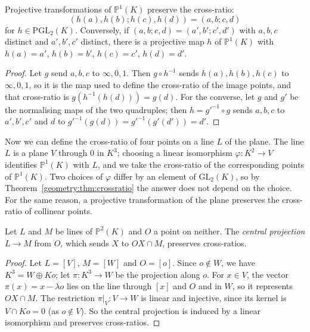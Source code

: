 \begin{theorem}\label{geometry:thm:crossratio}
Projective transformations of $\mathbb P^1(K)$ preserve the cross-ratio:
\[
(h(a),h(b);h(c),h(d))=(a,b;c,d)
\]
for $h\in\mathrm{PGL}_2(K)$.
Conversely, if $(a,b;c,d)=(a',b';c',d')$ with $a,b,c$ distinct and $a',b',c'$ distinct, there is a projective map $h$ of $\mathbb P^1(K)$ with $h(a)=a'$,
$h(b)=b'$, $h(c)=c'$, $h(d)=d'$.
\end{theorem}

\begin{proof}
Let $g$ send $a,b,c$ to $\infty,0,1$. Then $g\circ h^{-1}$ sends $h(a),h(b),h(c)$ to $\infty,0,1$, so it is the map used to define the cross-ratio of
the image points, and that cross-ratio is $g(h^{-1}(h(d)))=g(d)$. For the converse, let $g$ and $g'$ be the normalising maps of the two
quadruples; then $h=g'^{-1}\circ g$ sends $a,b,c$ to $a',b',c'$ and $d$ to $g'^{-1}(g(d))=g'^{-1}(g'(d'))=d'$.
\end{proof}

Now we can define the cross-ratio of four points on a line $L$ of the plane. The line $L$ is a plane $V$ through $0$ in $K^3$; choosing a linear
isomorphism $\varphi:K^2\to V$ identifies $\mathbb P^1(K)$ with $L$, and we take the cross-ratio of the corresponding points of $\mathbb P^1(K)$.
Two choices of $\varphi$ differ by an element of $\mathrm{GL}_2(K)$, so by Theorem~\ref{geometry:thm:crossratio} the answer does not depend on the
choice. For the same reason, a projective transformation of the plane preserves the cross-ratio of collinear points.

\begin{proposition}\label{geometry:prop:perspectivity}
Let $L$ and $M$ be lines of $\mathbb P^2(K)$ and $O$ a point on neither. The \emph{central projection} $L\to M$ from $O$, which sends $X$ to
$OX\cap M$, preserves cross-ratios.
\end{proposition}

\begin{proof}
Let $L=[V]$, $M=[W]$ and $O=[o]$. Since $o\notin W$, we have $K^3=W\oplus Ko$; let $\pi:K^3\to W$ be the projection along $o$. For $x\in V$, the
vector $\pi(x)=x-\lambda o$ lies on the line through $[x]$ and $O$ and in $W$, so it represents $OX\cap M$. The restriction $\pi|_V:V\to W$ is linear
and injective, since its kernel is $V\cap Ko=0$ (as $o\notin V$). So the central projection is induced by a linear isomorphism and preserves
cross-ratios.
\end{proof}

